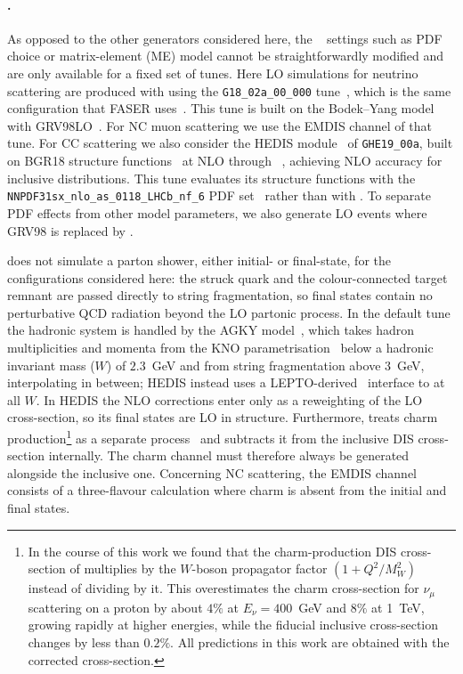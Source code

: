 \paragraph{\genie.}   
%
As opposed to the other generators considered here, the \genie~\cite{Andreopoulos:2009rq,Andreopoulos:2015wxa} settings such as PDF choice or matrix-element (ME) model cannot be straightforwardly modified and are only available for a fixed set of tunes. 
%
Here LO simulations for neutrino scattering are produced with \genie using 
the {\tt G18\_02a\_00\_000} tune~\cite{GENIE:2021zuu}, which is the same configuration that FASER uses~\cite{FASER:2024ykc}.
%
This tune is built on the Bodek--Yang model~\cite{Bodek:2002vp,Bodek:2003wd} with
GRV98LO~\cite{Gluck:1998xa}.  
%
For NC muon scattering we use the
{\sc EMDIS} channel of that tune.
%
For CC scattering we also consider the {\sc HEDIS} module~\cite{Soto:2021vdc} of {\tt GHE19\_00a}, built on BGR18 structure functions~\cite{Bertone:2018dse} at NLO through \apfel~\cite{Bertone:2013vaa}, achieving NLO accuracy for inclusive distributions.
%
This tune evaluates its structure functions with the {\tt NNPDF31sx\_nlo\_as\_0118\_LHCb\_nf\_6} PDF set~\cite{Ball:2017otu,Bertone:2018dse,NNPDF:2017mvq} rather than with \nnpdf.
% 
To separate PDF effects from other model parameters, we also generate LO events where GRV98
is replaced by \nnpdf.

\genie does not simulate a parton shower, either initial- or final-state, for the configurations considered here: the struck quark and the colour-connected target remnant are passed directly to string fragmentation, so \genie final states contain no perturbative QCD radiation beyond the LO partonic process.
%
In the default tune the hadronic system is handled by the {\sc AGKY} model~\cite{Yang:2009zx}, which takes hadron multiplicities and momenta from the KNO parametrisation~\cite{Koba:1972ng} below a hadronic invariant mass ($W$) of $2.3$~GeV and from \pythia string fragmentation above $3$~GeV, interpolating in between; {\sc HEDIS} instead uses a {\sc LEPTO}-derived~\cite{Ingelman:1996mq} interface to \pythia at all $W$.
%
In {\sc HEDIS} the NLO corrections enter only as a reweighting of the LO cross-section, so its final states are LO in structure. 
%
Furthermore, \genie treats charm production\footnote{In the course of this work we found that the charm-production DIS cross-section of \genie multiplies by the $W$-boson propagator factor $(1+Q^2/M_W^2)$ instead of dividing by it. 
%
This overestimates the charm cross-section for $\nu_\mu$ scattering on a proton by about $4\%$ at $E_\nu=400$~GeV and $8\%$ at 1~TeV, growing rapidly at higher energies, while the fiducial inclusive cross-section changes by less than $0.2\%$. All \genie predictions in this work are obtained with the corrected cross-section.}  as a separate process~\cite{Aivazis:1993pi} and subtracts it from the inclusive DIS cross-section internally.  
%
The charm channel must therefore always be generated alongside the
inclusive one.
%
Concerning NC scattering, the {\sc EMDIS} channel consists of a three-flavour calculation where charm is absent from the initial and final states. 


